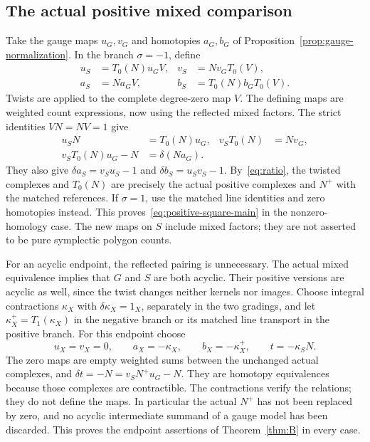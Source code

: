 \documentclass[11pt]{amsart}
\theoremstyle{definition}
\theoremstyle{remark}
\theoremstyle{plain}
\begin{document}
\subsection{The actual positive mixed comparison}
Take the gauge maps $u_G,v_G$ and homotopies $a_G,b_G$ of
Proposition~\ref{prop:gauge-normalization}. In the branch
$\sigma=-1$, define
\begin{align}\label{eq:symp-transfer}
 u_S&=T_0(N)u_GV,&v_S&=Nv_GT_0(V),\nonumber\\
 a_S&=Na_GV,&b_S&=T_0(N)b_GT_0(V).
\end{align}
Twists are applied to the complete degree-zero map $V$.
The defining maps are weighted count expressions, now using
the reflected mixed factors. The strict identities $VN=NV=1$
give
\begin{align}\label{eq:strict-transfer-squares}
 u_SN&=T_0(N)u_G,&v_ST_0(N)&=Nv_G,\nonumber\\
 v_ST_0(N)u_G-N&=\delta(Na_G).
\end{align}
They also give $\delta a_S=v_Su_S-1$ and
$\delta b_S=u_Sv_S-1$. By~\eqref{eq:ratio}, the twisted
complexes and $T_0(N)$ are precisely the actual positive
complexes and $N^+$ with the matched references. If $\sigma=1$,
use the matched line identities and zero homotopies instead.
This proves~\eqref{eq:positive-square-main} in the nonzero-homology
case. The new maps on $S$ include mixed factors; they are not
asserted to be pure symplectic polygon counts.

For an acyclic endpoint, the reflected pairing is unnecessary.
The actual mixed equivalence implies that $G$ and $S$ are both
acyclic. Their positive versions are acyclic as well, since the
twist changes neither kernels nor images. Choose integral
contractions $\kappa_X$ with $\delta\kappa_X=1_X$, separately
in the two gradings, and let $\kappa_X^+=T_1(\kappa_X)$ in
the negative branch or its matched line transport in the positive
branch. For this endpoint choose
\begin{equation}\label{eq:acyclic-package}
 u_X=v_X=0,\qquad a_X=-\kappa_X,\qquad b_X=-\kappa_X^+,
 \qquad t=-\kappa_SN.
\end{equation}
The zero maps are empty weighted sums between the unchanged
actual complexes, and
$\delta t=-N=v_SN^+u_G-N$. They are homotopy equivalences
because those complexes are contractible. The contractions
verify the relations; they do not define the maps. In particular
the actual $N^+$ has not been replaced by zero, and no acyclic
intermediate summand of a gauge model has been discarded.
This proves the endpoint assertions of Theorem~\ref{thm:B}
in every case.
\end{document}
